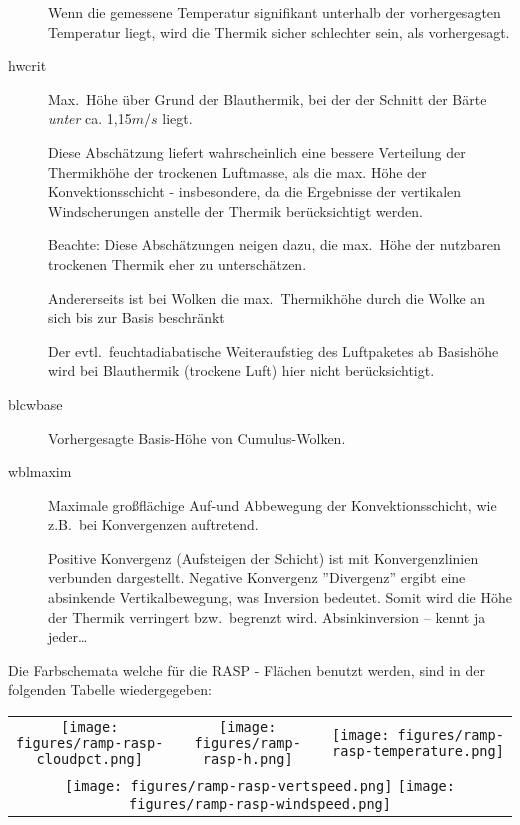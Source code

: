 \begin{description}
Wenn die gemessene Temperatur signifikant unterhalb der vorhergesagten Temperatur
liegt, wird die Thermik sicher schlechter sein, als vorhergesagt.
\item[hwcrit]
Max.\ Höhe über Grund der Blauthermik, bei der der Schnitt der Bärte  \textsl{unter} ca. 1,15$m/s$ liegt.

Diese Abschätzung liefert  wahrscheinlich eine bessere Verteilung der Thermikhöhe
der trockenen Luftmasse, als die max. Höhe der Konvektionsschicht - insbesondere,
da die Ergebnisse der vertikalen Windscherungen anstelle der Thermik berücksichtigt
werden.

Beachte: Diese Abschätzungen neigen dazu, die max.\ Höhe der
nutzbaren trockenen Thermik eher zu unterschätzen.

Andererseits ist bei Wolken die max.\ Thermikhöhe durch  die Wolke an sich bis
zur Basis  beschränkt

Der evtl.\ feuchtadiabatische Weiteraufstieg des Luftpaketes ab Basishöhe wird bei
Blauthermik (trockene Luft) hier nicht berücksichtigt.
\item[blcwbase] Vorhergesagte Basis-Höhe von Cumulus-Wolken.

\item[wblmaxim] Maximale großflächige Auf-und Abbewegung der Konvektionsschicht, wie
z.B.\ bei Konvergenzen auftretend.

Positive Konvergenz (Aufsteigen der Schicht) ist mit Konvergenzlinien verbunden dargestellt.
Negative Konvergenz ''Divergenz'' ergibt eine absinkende Vertikalbewegung, was Inversion bedeutet.
Somit wird die Höhe der Thermik verringert bzw.\ begrenzt wird.
Absinkinversion -- kennt ja jeder\dots
\end{description}

\begin{maxipage}
Die Farbschemata welche für die RASP - Flächen benutzt werden, sind in der folgenden Tabelle wiedergegeben:

\begin{longtable}{c c c}
\texttt{[image: figures/ramp-rasp-cloudpct.png]}&
\texttt{[image: figures/ramp-rasp-h.png]}&
\texttt{[image: figures/ramp-rasp-temperature.png]}\\
\multicolumn{3}{c}{\texttt{[image: figures/ramp-rasp-vertspeed.png]}\quad
\texttt{[image: figures/ramp-rasp-windspeed.png]}} \\
\end{longtable}
\end{maxipage}
